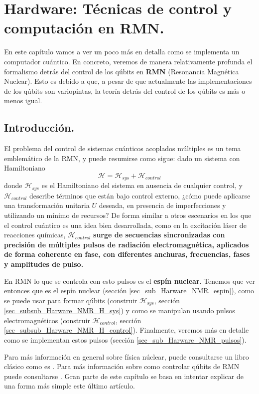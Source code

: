 \documentclass[a4paper,11pt]{book} %
\numberwithin{equation}{chapter}
\begin{document}
\chapter{Hardware: Técnicas de control y computación en RMN.}

En este capítulo vamos a ver un poco más en detalla como se implementa un computador cuántico. En concreto, veremos de manera relativamente profunda el formalismo detrás del control de los qúbits en \textbf{RMN} (Resonancia Magnética Nuclear). Esto es debido a que, a pesar de que actualmente las implementaciones de los qúbits son variopintas, la teoría detrás del control de los qúbits es más o menos igual. 

	\section{Introducción.}

El problema del control de sistemas cuánticos acoplados múltiples es un tema emblemático de la RMN, y puede resumirse como sigue: dado un sistema con Hamiltoniano
\begin{equation}
\mathcal{H} = \mathcal{H}_{sys} + \mathcal{H}_{control}
\end{equation}
donde $\mathcal{H}_{sys}$ es el Hamiltoniano del sistema en ausencia de cualquier control, y $\mathcal{H}_{control}$ describe términos que están bajo control externo, ¿cómo puede aplicarse una transformación unitaria $U$ deseada, en presencia de imperfecciones y utilizando un mínimo de recursos? De forma similar a otros escenarios en los que el control cuántico es una idea bien desarrollada, como en la excitación láser de reacciones químicas, $\mathcal{H}_{control}$ \textbf{surge de secuencias sincronizadas con precisión de múltiples pulsos de radiación electromagnética, aplicados de forma coherente en fase, con diferentes anchuras, frecuencias, fases y amplitudes de pulso.}

En RMN lo que se controla con esto pulsos es el \textbf{espín nuclear}. Tenemos que ver entonces que es el espín nuclear (sección \ref{sec_sub_Harware_NMR_espin}), como se puede usar para formar qúbits (construir $\mathcal{H}_{sys}$, sección \ref{sec_subsub_Harware_NMR_H_sys}) y como se  manipulan usando pulsos electromagnéticos (construir $\mathcal{H}_{control}$, sección \ref{sec_subsub_Harware_NMR_H_control}). Finalmente, veremos más en detalle como se implementan estos pulsos (sección \ref{sec_sub_Harware_NMR_pulsos}).

Para más información en general sobre física núclear, puede consultarse un libro clásico como es \cite{bib_Krane:359790}. Para más información sobre como controlar qúbits de RMN puede consultarse \cite{bib_NMR_hardware}. Gran parte de este capítulo se basa en intentar explicar de una forma más simple este último artículo.
\end{document}
